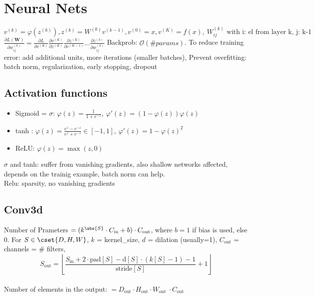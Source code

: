 \section{Neural Nets}

$v^{(k)}=\varphi(z^{(k)}), z^{(k)}=W^{(k)}v^{(k-1)}, v^{(0)}=x, v^{(K)} = f(x),\ W_{ij}^{(k)} \text{ with i: el from layer k, j: k-1}$\\
$\frac{\partial L(\bm{W})}{\partial w_{ij}^{(k)}} = \frac{\partial L}{\partial v^{(K)}}
\frac{\partial v^{(K)}}{\partial z^{(K)}} \frac{\partial z^{(K)}}{\partial v^{(K-1)}} ...
\frac{\partial z^{(k)}}{\partial w_{ij}^{(k)}}$
Backprob: $\mathcal{O}(\# params)$.
To reduce training error: add additional units, more iterations (smaller batches),
Prevent overfitting: batch norm, regularization, early stopping, dropout

\subsection{Activation functions}
\begin{itemize}
  \item
  Sigmoid = $\sigma$: $\varphi(z) = \frac{1}{1 + e^{-z}},\ \varphi'(z) = (1 - \varphi(z))\varphi(z)$
  \item tanh : $\varphi(z) = \frac{e^{z} - e^{-z}}{e^{z}+ e^{-z}} \in [-1,1],\ \varphi'(z) = 1 - \varphi(z)^{2}$
  \item
  ReLU: $\varphi(z) = \max(z, 0) \qquad$
\end{itemize}
$\sigma$ and tanh: suffer from vanishing gradients, also shallow networks affected, depends on the trainig example,
batch norm can help.\\
Relu: sparsity, no vanishing gradients
%

\subsection{Conv3d}
Number of Prameters $=(k^{\abs{S}}\cdot C_{\text{in}}+b)\cdot C_{\text{out}}$,
where $b = 1$ if bias is used, else $0$. For $S \in \cset{D, H, W}$,
$k$ = kernel\_size, $d$ = dilation (usually=1), $C_{\text{out}}$ = channels = \# filters,
\[
  S_{\text{out}} = \left\lfloor \frac{S_{\text{in}} + 2 \cdot \text{pad}[S] - \text{d}[S] \cdot (k[S] - 1) - 1}
  {\text{stride}[S]} + 1 \right\rfloor
\]\\
Number of elements in the output: $= D_{\text{out}}\cdot H_{\text{out}} \cdot W_{\text{out }}\cdot C_{\text{out}}$
